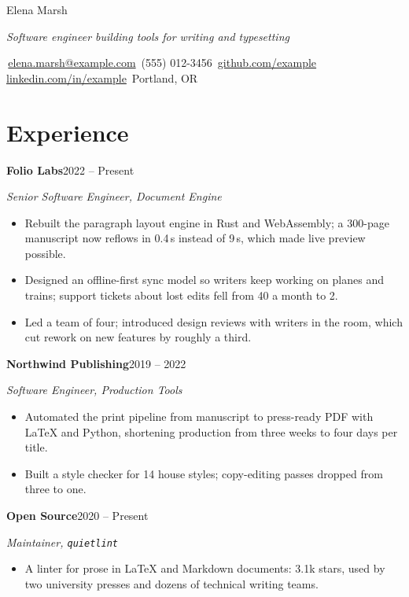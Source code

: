 \documentclass[letterpaper,11pt]{article}
\newcommand{\role}[4]{%
  \par\vspace{4pt}
  {\bfseries\color{ink}#1}\enspace{\small\color{mist}#2}\hfill{\small\color{mist}#4}\par
  {\itshape #3}\par}
\begin{document}
{\fontsize{26}{30}\selectfont\color{ink}Elena Marsh}\par
\vspace{3pt}
{\large\itshape\color{mist}Software engineer building tools for writing and typesetting}\par
\vspace{7pt}
{\small\color{ink}
  \faEnvelope[regular]\,\href{mailto:elena.marsh@example.com}{elena.marsh@example.com}\quad
  \faPhone*\,(555) 012-3456\quad
  \faGithub\,\href{https://github.com/example}{github.com/example}\quad
  \faLinkedin\,\href{https://linkedin.com/in/example}{linkedin.com/in/example}\quad
  \faMapMarker*\,Portland, OR\par}

\section{Experience}

\role{Folio Labs}{Remote}{Senior Software Engineer, Document Engine}{2022 -- Present}
\begin{itemize}
  \item Rebuilt the paragraph layout engine in Rust and WebAssembly; a 300-page manuscript now
        reflows in 0.4\,s instead of 9\,s, which made live preview possible.
  \item Designed an offline-first sync model so writers keep working on planes and trains;
        support tickets about lost edits fell from 40 a month to 2.
  \item Led a team of four; introduced design reviews with writers in the room, which cut
        rework on new features by roughly a third.
\end{itemize}

\role{Northwind Publishing}{Seattle, WA}{Software Engineer, Production Tools}{2019 -- 2022}
\begin{itemize}
  \item Automated the print pipeline from manuscript to press-ready PDF with \LaTeX{} and
        Python, shortening production from three weeks to four days per title.
  \item Built a style checker for 14 house styles; copy-editing passes dropped from three to one.
\end{itemize}

\role{Open Source}{}{Maintainer, \textup{\texttt{quietlint}}}{2020 -- Present}
\begin{itemize}
  \item A linter for prose in \LaTeX{} and Markdown documents: 3.1k stars, used by two
        university presses and dozens of technical writing teams.
\end{itemize}
\end{document}
